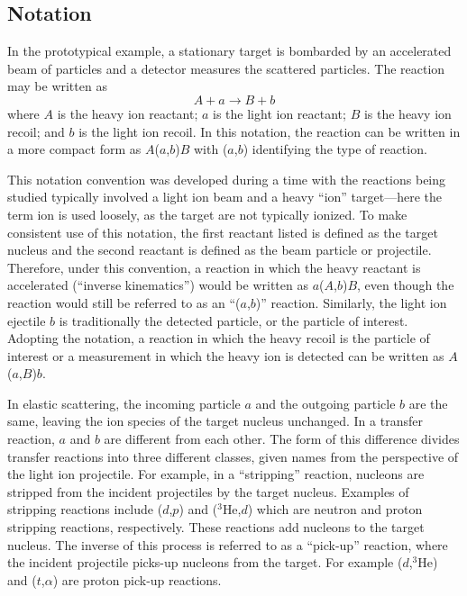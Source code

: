 \subsection{Notation}
In the prototypical example, a stationary target is bombarded by an accelerated beam of particles and a detector measures the scattered particles.  The reaction may be written as
\begin{equation}
A+a\rightarrow B+b
\label{basic_reaction}
\end{equation}
where $A$ is the heavy ion reactant; $a$ is the light ion reactant; $B$ is the heavy ion recoil; and $b$ is the light ion recoil.  In this notation, the reaction can be written in a more compact form as $A$($a$,$b$)$B$ with ($a$,$b$) identifying the type of reaction.   

This notation convention was developed during a time with the reactions being studied typically involved a light ion beam and a heavy ``ion'' target---here the term ion is used loosely, as the target are not typically ionized.  To make consistent use of this notation, the first reactant listed is defined as the target nucleus and the second reactant is defined as the beam particle or projectile.  Therefore, under this convention, a reaction in which the heavy reactant is accelerated (``inverse kinematics'') would be written as $a$($A$,$b$)$B$, even though the reaction would still be referred to as an ``($a$,$b$)'' reaction.  Similarly, the light ion ejectile $b$ is traditionally the detected particle, or the particle of interest.  Adopting the notation, a reaction in which the heavy recoil is the particle of interest or a measurement in which the heavy ion is detected can be written as $A$($a$,$B$)$b$. 

In elastic scattering, the incoming particle $a$ and the outgoing particle $b$ are the same, leaving the ion species of the target nucleus unchanged.  In a transfer reaction,  $a$ and $b$ are different from each other.  The form of this difference divides transfer reactions into three different classes, given names from the perspective of the light ion projectile.  For example, in a ``stripping'' reaction, nucleons are stripped from the incident projectiles by the target nucleus.  Examples of stripping reactions include ($d$,$p$) and ($^3$He,$d$) which are neutron and proton stripping reactions, respectively.  These reactions add nucleons to the target nucleus.  The inverse of this process is referred to as a ``pick-up'' reaction, where the incident projectile picks-up nucleons from the target.  For example ($d$,$^3$He) and ($t$,$\alpha$) are proton pick-up reactions.

